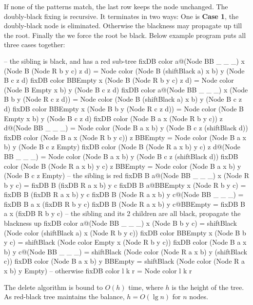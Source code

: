 \documentclass[b5paper]{article}
\begin{document}
If none of the patterns match, the last row keeps the node unchanged. The doubly-black fixing is recursive. It terminates in two ways: One is \textbf{Case 1}, the doubly-black node is eliminated. Otherwise the blackness may propagate up till the root. Finally the we force the root be black. Below example program puts all three cases together:

\begin{Haskell}
-- the sibling is black, and has a red sub-tree
fixDB color a@(Node BB _ _ _) x (Node B (Node R b y c) z d)
      = Node color (Node B (shiftBlack a) x b) y (Node B c z d)
fixDB color BBEmpty x (Node B (Node R b y c) z d)
      = Node color (Node B Empty x b) y (Node B c z d)
fixDB color a@(Node BB _ _ _) x (Node B b y (Node R c z d))
      = Node color (Node B (shiftBlack a) x b) y (Node B c z d)
fixDB color BBEmpty x (Node B b y (Node R c z d))
      = Node color (Node B Empty x b) y (Node B c z d)
fixDB color (Node B a x (Node R b y c)) z d@(Node BB _ _ _)
      = Node color (Node B a x b) y (Node B c z (shiftBlack d))
fixDB color (Node B a x (Node R b y c)) z BBEmpty
      = Node color (Node B a x b) y (Node B c z Empty)
fixDB color (Node B (Node R a x b) y c) z d@(Node BB _ _ _)
      = Node color (Node B a x b) y (Node B c z (shiftBlack d))
fixDB color (Node B (Node R a x b) y c) z BBEmpty
      = Node color (Node B a x b) y (Node B c z Empty)
-- the sibling is red
fixDB B a@(Node BB _ _ _) x (Node R b y c)
      = fixDB B (fixDB R a x b) y c
fixDB B a@BBEmpty x (Node R b y c)
      = fixDB B (fixDB R a x b) y c
fixDB B (Node R a x b) y c@(Node BB _ _ _)
      = fixDB B a x (fixDB R b y c)
fixDB B (Node R a x b) y c@BBEmpty
      = fixDB B a x (fixDB R b y c)
-- the sibling and its 2 children are all black, propagate the blackness up
fixDB color a@(Node BB _ _ _) x (Node B b y c)
      = shiftBlack (Node color (shiftBlack a) x (Node R b y c))
fixDB color BBEmpty x (Node B b y c)
      = shiftBlack (Node color Empty x (Node R b y c))
fixDB color (Node B a x b) y c@(Node BB _ _ _)
      = shiftBlack (Node color (Node R a x b) y (shiftBlack c))
fixDB color (Node B a x b) y BBEmpty
      = shiftBlack (Node color (Node R a x b) y Empty)
-- otherwise
fixDB color l k r = Node color l k r
\end{Haskell}

The delete algorithm is bound to $O(h)$ time, where $h$ is the height of the tree. As red-black tree maintains the balance, $h = O(\lg n)$ for $n$ nodes.

\begin{Exercise}
\end{Exercise}
\end{document}
